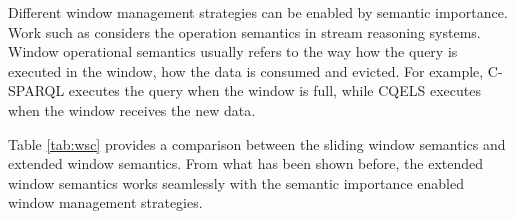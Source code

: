 Different window management strategies can be enabled by semantic importance. 
Work such as \cite{dell2013correctness} considers the operation semantics in stream reasoning systems. 
Window operational semantics usually refers to the way how the query is executed in the window, how the data is consumed and evicted. 
For example, C-SPARQL executes the query when the window is full, while CQELS executes when the window receives the new data.

Table \ref{tab:wsc} provides a comparison between the sliding window semantics and extended window semantics.
From what has been shown before, the extended window semantics works seamlessly with the semantic importance enabled window management strategies. 
%